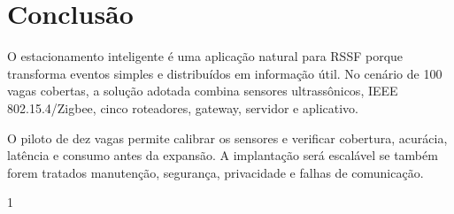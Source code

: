 \documentclass[11pt,a4paper]{article}
\begin{document}
\section{Conclusão}
O estacionamento inteligente é uma aplicação natural para RSSF porque transforma eventos simples e distribuídos em informação útil. No cenário de 100 vagas cobertas, a solução adotada combina sensores ultrassônicos, IEEE 802.15.4/Zigbee, cinco roteadores, gateway, servidor e aplicativo.

O piloto de dez vagas permite calibrar os sensores e verificar cobertura, acurácia, latência e consumo antes da expansão. A implantação será escalável se também forem tratados manutenção, segurança, privacidade e falhas de comunicação.

\begin{spacing}{1}
    \footnotesize
    
    
\end{spacing}
\end{document}
